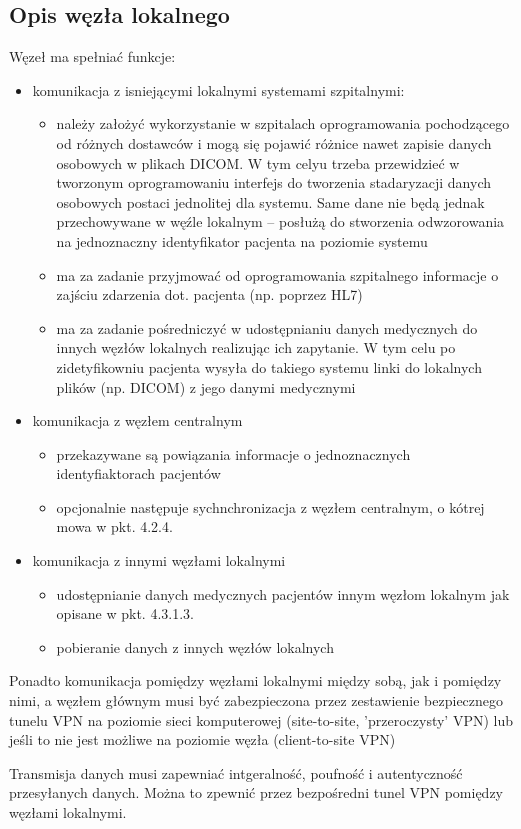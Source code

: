\documentclass[a4paper]{article}
\begin{document}
\subsection{Opis węzła lokalnego}
Węzeł ma spełniać funkcje:
\begin{itemize}
\item komunikacja z isniejącymi lokalnymi systemami szpitalnymi:
  \begin{itemize}
  \item należy założyć wykorzystanie w szpitalach oprogramowania pochodzącego od różnych dostawców i mogą 
	  się pojawić różnice nawet zapisie danych osobowych w plikach DICOM. W tym celyu trzeba przewidzieć 
	  w tworzonym oprogramowaniu interfejs do tworzenia stadaryzacji danych osobowych postaci jednolitej 
	  dla systemu. Same dane nie będą jednak przechowywane w węźle lokalnym – posłużą do stworzenia odwzorowania 
	  na jednoznaczny identyfikator pacjenta na poziomie systemu
  \item ma za zadanie przyjmować od oprogramowania szpitalnego informacje o zajściu zdarzenia dot. pacjenta (np. poprzez HL7)
  \item ma za zadanie pośredniczyć w udostępnianiu danych medycznych do innych węzłów lokalnych realizując 
	  ich zapytanie. W tym celu po zidetyfikowniu pacjenta wysyła do takiego systemu linki do lokalnych 
	  plików (np. DICOM) z jego danymi medycznymi
  \end{itemize}

\item komunikacja z węzłem centralnym
  \begin{itemize}
  \item przekazywane są powiązania informacje o jednoznacznych identyfiaktorach pacjentów
  \item opcjonalnie następuje sychnchronizacja z węzłem centralnym, o kótrej mowa w pkt. 4.2.4.
  \end{itemize}

\item komunikacja z innymi węzłami lokalnymi
  \begin{itemize}
  \item udostępnianie danych medycznych pacjentów innym węzłom lokalnym jak opisane w pkt.  4.3.1.3.
  \item pobieranie danych z innych węzłów lokalnych
  \end{itemize}
\end{itemize}

Ponadto komunikacja pomiędzy węzłami lokalnymi między sobą, jak i pomiędzy nimi, a węzłem głównym musi 
być zabezpieczona przez zestawienie bezpiecznego tunelu VPN na poziomie sieci komputerowej (site-to-site, 
'przeroczysty' VPN) lub jeśli to nie jest możliwe na poziomie węzła (client-to-site VPN)

Transmisja danych musi zapewniać intgeralność, poufność i autentyczność przesyłanych danych. 
Można to zpewnić przez bezpośredni tunel VPN pomiędzy węzłami lokalnymi.
\end{document}
